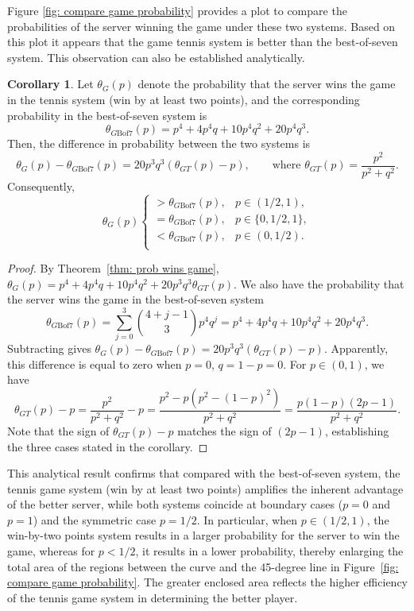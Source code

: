 \documentclass[11pt]{article}
\theoremstyle{plain}
\theoremstyle{definition}
\newtheorem{corollary}{Corollary}[theorem]
\begin{document}
{Figure \ref{fig: compare game probability} provides a plot to compare the probabilities of the server winning the game under these two systems. Based on this plot it appears that the game tennis system is better than the best-of-seven system. %
%
This observation can also be established analytically.
%
\begin{corollary}
    Let $\theta_G(p)$ denote the probability that the server wins the game in the tennis system (win by at least two points), and the corresponding probability in the best-of-seven system is     
    $$\theta_{G\mathrm{Bof7}}(p) = p^4 + 4p^4q + 10p^4q^2 + 20p^4q^3.$$
    Then, the difference in probability between the two systems is
    \[ 
    \theta_G(p) - \theta_{G\mathrm{Bof7}}(p) = 20p^3q^3\left( \theta_{GT}(p) - p \right), \qquad \text{where } \theta_{GT}(p) = \frac{p^2}{p^2+q^2}.
    \]
    Consequently,
    \[
    \theta_G(p)
    \begin{cases}
    > \theta_{G\mathrm{Bof7}}(p), & p \in (1/2, 1),\\
    = \theta_{G\mathrm{Bof7}}(p), & p \in \{0, 1/2, 1\},\\
    < \theta_{G\mathrm{Bof7}}(p), & p \in (0, 1/2).\\
    \end{cases}
    \]
\end{corollary}
%
\begin{proof}
    By Theorem~\ref{thm: prob wins game}, $\theta_G(p) = p^4 + 4p^4 q + 10p^4 q^2 + 20p^3 q^3 \theta_{GT}(p).$ We also have the probability that the server wins the game in the best-of-seven system
    \[
        \theta_{G\mathrm{Bof7}}(p) = \sum_{j=0}^3 {{4+j-1} \choose 3} p^4 q^j = p^4 + 4p^4q + 10p^4q^2 + 20p^4q^3.
    \]
    Subtracting gives $\theta_G(p) - \theta_{G\mathrm{Bof7}}(p) = 20p^3q^3(\theta_{GT}(p)-p)$. Apparently, this difference is equal to zero when $p = 0$, $q = 1-p = 0$. 
    For $p \in (0,1)$, we have
    \[
    \theta_{GT}(p)-p = \frac{p^2}{p^2+q^2}-p
    = \frac{p^2-p(p^2-(1-p)^2)}{p^2+q^2}
    =  \frac{p(1-p)(2p-1)}{p^2+q^2}.
    \]
    Note that the sign of $\theta_{GT}(p)-p$ matches the sign of $(2p-1)$, establishing the three cases stated in the corollary.
\end{proof}
%
This analytical result confirms that compared with the best-of-seven system, the tennis game system (win by at least two points) amplifies the inherent advantage of the better server, while both systems coincide at boundary cases ($p = 0$ and $p = 1$) and the symmetric case $p = 1/2$. 
%
In particular, when $p \in (1/2, 1)$, the win-by-two points system results in a larger probability for the server to win the game, whereas for $p < 1/2$, it results in a lower probability, thereby enlarging the total area of the regions between the curve and the 45-degree line in Figure~\ref{fig: compare game probability}. The greater enclosed area reflects the higher efficiency of the tennis game system in determining the better player.
%

}
\end{document}
